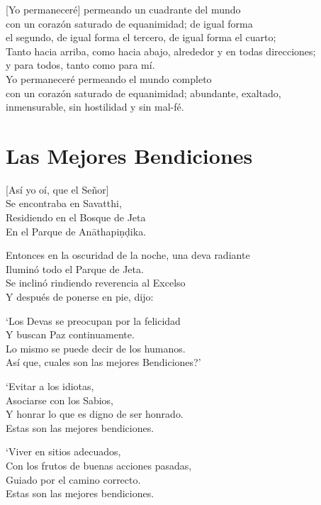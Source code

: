 \clearpage

[Yo permaneceré] permeando un cuadrante del mundo\\
\vin con un corazón saturado de equanimidad; de igual forma\\
\vin el segundo, de igual forma el tercero, de igual forma el cuarto;\\
Tanto hacia arriba, como hacia abajo, alrededor y en todas direcciones;\\
\vin y para todos, tanto como para mí.\\
Yo permaneceré permeando el mundo completo\\
\vin con un corazón saturado de equanimidad; abundante, exaltado,\\
\vin inmensurable, sin hostilidad y sin mal-fé.

\chapter{Las Mejores Bendiciones}


\begin{leader}
\end{leader}

[Así yo oí, que el Señor]\\
Se encontraba en Savatthi,\\
Residiendo en el Bosque de Jeta\\
En el Parque de Anāthapiṇḍika.

Entonces en la oscuridad de la noche, una deva radiante\\
Iluminó todo el Parque de Jeta.\\
Se inclinó rindiendo reverencia al Excelso\\
Y después de ponerse en pie, dijo:

`Los Devas se preocupan por la felicidad\\
Y buscan Paz continuamente.\\
Lo mismo se puede decir de los humanos.\\
Así que, cuales son las mejores Bendiciones?'

`Evitar a los idiotas,\\
Asociarse con los Sabios,\\
Y honrar lo que es digno de ser honrado.\\
Estas son las mejores bendiciones.

`Viver en sitios adecuados,\\
Con los frutos de buenas acciones pasadas,\\
Guiado por el camino correcto.\\
Estas son las mejores bendiciones.

